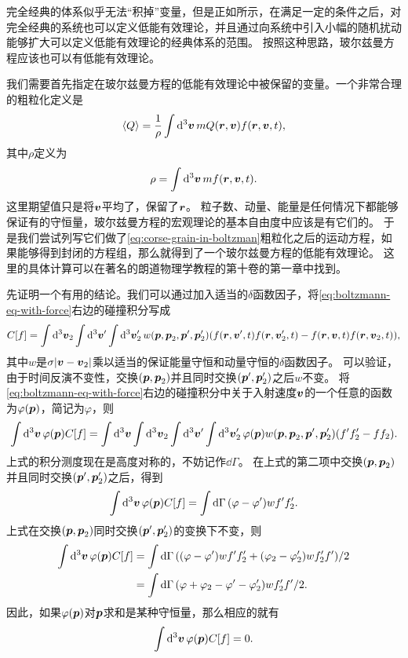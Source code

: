 完全经典的体系似乎无法“积掉”变量，但是正如\cite{reall2021effective}所示，在满足一定的条件之后，对完全经典的系统也可以定义低能有效理论，并且通过向系统中引入小幅的随机扰动能够扩大可以定义低能有效理论的经典体系的范围。
按照这种思路，玻尔兹曼方程应该也可以有低能有效理论。

我们需要首先指定在玻尔兹曼方程的低能有效理论中被保留的变量。一个非常合理的粗粒化定义是
\begin{equation}
    \expval{Q} = \frac{1}{\rho} \int \dd[3]{\vb*{v}} m Q(\vb*{r}, \vb*{v}) f(\vb*{r}, \vb*{v}, t),
    \label{eq:corse-grain-in-boltzman}
\end{equation}
其中$\rho$定义为
\begin{equation}
    \rho = \int \dd[3]{\vb*{v}} m f(\vb*{r}, \vb*{v}, t).
\end{equation}
这里期望值只是将$\vb*{v}$平均了，保留了$\vb*{r}$。
粒子数、动量、能量是任何情况下都能够保证有的守恒量，玻尔兹曼方程的宏观理论的基本自由度中应该是有它们的。
于是我们尝试列写它们做了\eqref{eq:corse-grain-in-boltzman}粗粒化之后的运动方程，如果能够得到封闭的方程组，那么就得到了一个玻尔兹曼方程的低能有效理论。
这里的具体计算可以在著名的朗道物理学教程的第十卷\cite{lifsic_physical_2008}的第一章中找到。

先证明一个有用的结论。我们可以通过加入适当的$\delta$函数因子，将\eqref{eq:boltzmann-eq-with-force}右边的碰撞积分写成
\begin{equation}
    C[f] = \int \dd[3]{\vb*{v}_2} \int \dd[3]{\vb*{v}'} \int \dd[3]{\vb*{v}_2'} w(\vb*{p}, \vb*{p}_2, \vb*{p}', \vb*{p}_2') (f(\vb*{r}, \vb*{v}', t) f(\vb*{r}, \vb*{v}'_{2}, t) - f(\vb*{r}, \vb*{v}, t) f(\vb*{r}, \vb*{v}_{2}, t)),
\end{equation}
其中$w$是$\sigma \abs{\vb*{v} - \vb*{v}_2}$乘以适当的保证能量守恒和动量守恒的$\delta$函数因子。
可以验证，由于时间反演不变性，交换$(\vb*{p}, \vb*{p}_2)$并且同时交换$(\vb*{p}', \vb*{p}_2')$之后$w$不变。
将\eqref{eq:boltzmann-eq-with-force}右边的碰撞积分中关于入射速度$\vb*{v}$的一个任意的函数为$\varphi(\vb*{p})$，简记为$\varphi$，则
\[
    \int \dd[3]{\vb*{v}} \varphi(\vb*{p}) C[f] = \int \dd[3]{\vb*{v}} \int \dd[3]{\vb*{v}_2} \int \dd[3]{\vb*{v}'} \int \dd[3]{\vb*{v}_2'} \varphi(\vb*{p}) w(\vb*{p}, \vb*{p}_2, \vb*{p}', \vb*{p}_2') (f' f_2' - f f_2).
\]
上式的积分测度现在是高度对称的，不妨记作$\dd{\Gamma}$。
在上式的第二项中交换$(\vb*{p}, \vb*{p}_2)$并且同时交换$(\vb*{p}', \vb*{p}_2')$之后，得到
\[
    \int \dd[3]{\vb*{v}} \varphi(\vb*{p}) C[f] = \int \dd{\Gamma} (\varphi - \varphi') w f' f_2'.
\]
上式在交换$(\vb*{p}, \vb*{p}_2)$同时交换$(\vb*{p}', \vb*{p}_2')$的变换下不变，则
\[
    \begin{aligned}
        \int \dd[3]{\vb*{v}} \varphi(\vb*{p}) C[f] &= \int \dd{\Gamma} ((\varphi - \varphi') w f' f_2' + (\varphi_2 - \varphi_2') w f'_2 f') / 2 \\
        &= \int \dd{\Gamma} (\varphi + \varphi_2 - \varphi' - \varphi'_2) w f'_2 f' / 2.
    \end{aligned}
\]
因此，如果$\varphi(\vb*{p})$对$\vb*{p}$求和是某种守恒量，那么相应的就有
\begin{equation}
    \int \dd[3]{\vb*{v}} \varphi(\vb*{p}) C[f] = 0.
    \label{eq:collision-conservation}
\end{equation}

